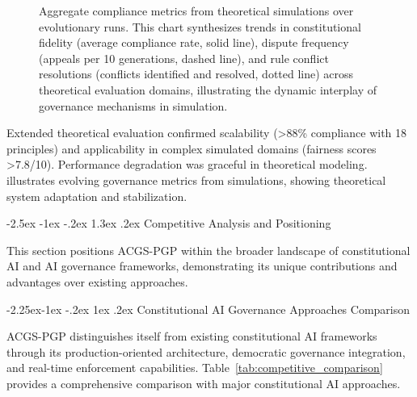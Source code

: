 \documentclass[manuscript,screen,9pt]{acmart}
\makeatletter
\renewcommand\section{\@startsection{section}{1}{\z@}%
  {-2.5ex \@plus -1ex \@minus -.2ex}%
  {1.3ex \@plus.2ex}%
  {\normalfont\Large\bfseries}}
\renewcommand\subsection{\@startsection{subsection}{2}{\z@}%
  {-2.25ex\@plus -1ex \@minus -.2ex}%
  {1ex \@plus .2ex}%
  {\normalfont\large\bfseries}}
\makeatother
\begin{document}
\begin{table}[!htb]
\FloatBarrier %
\begin{figure}[!htb]
\centering
\caption{Aggregate compliance metrics from theoretical simulations over evolutionary runs. This chart synthesizes trends in constitutional fidelity (average compliance rate, solid line), dispute frequency (appeals per 10 generations, dashed line), and rule conflict resolutions (conflicts identified and resolved, dotted line) across theoretical evaluation domains, illustrating the dynamic interplay of governance mechanisms in simulation.}
\label{fig:compliance-trends}
\end{figure}

Extended theoretical evaluation confirmed scalability (>88\% compliance with 18 principles) and applicability in complex simulated domains (fairness scores >7.8/10). Performance degradation was graceful in theoretical modeling.  illustrates evolving governance metrics from simulations, showing theoretical system adaptation and stabilization.

\section{Competitive Analysis and Positioning}
\label{sec:competitive_analysis}

This section positions ACGS-PGP within the broader landscape of constitutional AI and AI governance frameworks, demonstrating its unique contributions and advantages over existing approaches.

\subsection{Constitutional AI Governance Approaches Comparison}

ACGS-PGP distinguishes itself from existing constitutional AI frameworks through its production-oriented architecture, democratic governance integration, and real-time enforcement capabilities. Table~\ref{tab:competitive_comparison} provides a comprehensive comparison with major constitutional AI approaches.


\end{table}
\end{document}
